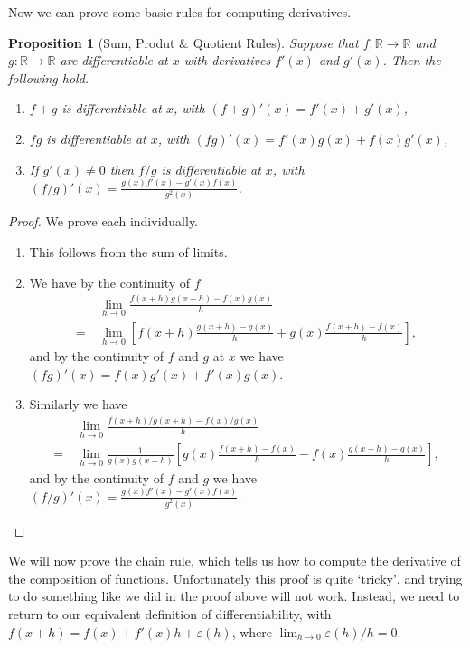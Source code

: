 \documentclass[11pt, a4paper]{article}
\newtheorem{proposition}[theorem]{Proposition}
\theoremstyle{definition}
\newcommand{\R}{\mathbb{R}}
\begin{document}
Now we can prove some basic rules for computing derivatives.

\begin{proposition}[Sum, Produt \& Quotient Rules]
	Suppose that $f: \R \rightarrow \R$ and $g: \R \rightarrow \R$ are differentiable at $x$ with derivatives $f'(x)$ and $g'(x)$.
	Then the following hold.
	\begin{enumerate}[label=(\roman*)]
		\item $f + g$ is differentiable at $x$, with $(f + g)'(x)= f'(x) + g'(x)$,
		\item $fg$ is differentiable at $x$, with $(fg)'(x) = f'(x)g(x) + f(x)g'(x)$,
		\item If $g'(x) \neq 0$ then $f/g$ is differentiable at $x$, with $(f/g)'(x) = \frac{g(x)f'(x) - g'(x)f(x)}{g^2(x)}$.
	\end{enumerate}
\end{proposition}
\begin{proof}
	We prove each individually.
	\begin{enumerate}[label=(\roman*)]
		\item This follows from the sum of limits.
		\item We have by the continuity of $f$
		\begin{align*}
			&\lim_{h \to 0} \frac{f(x + h)g(x + h) - f(x)g(x)}{h} \\
			=\ &\lim_{h \to 0}\left[ f(x+h) \frac{g(x + h) - g(x)}{h} + g(x)\frac{f(x + h) - f(x)}{h}\right],
		\end{align*}
		and by the continuity of $f$ and $g$ at $x$ we have $(fg)'(x) = f(x)g'(x) + f'(x) g(x)$.
		\item Similarly we have
		\begin{align*}
			&\lim_{h \to 0} \frac{f(x + h)/g(x + h) - f(x)/g(x)}{h} \\
		=\ &\lim_{h \to 0} \frac{1}{g(x)g(x + h)} \left[g(x)\frac{f(x + h) - f(x)}{h} - f(x) \frac{g(x + h) - g(x)}{h}\right],
		\end{align*}
		and by the continuity of $f$ and $g$ we have $(f/g)'(x) = \frac{g(x)f'(x) - g'(x)f(x)}{g^2(x)}$. \qedhere
	\end{enumerate}
\end{proof}


We will now prove the chain rule, which tells us how to compute the derivative of the composition of functions. Unfortunately this proof is quite `tricky', and trying to do something like we did in the proof above will not work. Instead, we need to return to our equivalent definition of differentiability, with $f(x + h) = f(x) + f'(x) h + \varepsilon(h)$, where $\displaystyle\lim_{h \to 0}\varepsilon(h)/h = 0$.
\end{document}
